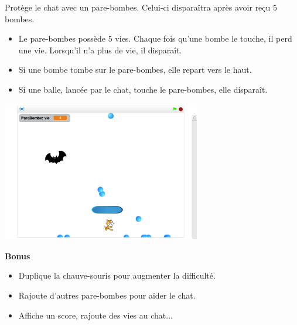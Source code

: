 \documentclass[class=report,crop=false, 12pt]{standalone}
\begin{document}
\begin{activite}

Protège le chat avec un pare-bombes. Celui-ci disparaîtra après avoir reçu $5$ bombes.
\begin{itemize}
  \item Le pare-bombes possède $5$ vies. Chaque fois qu'une bombe le touche, il perd une vie. Lorsqu'il n'a plus de vie, il disparaît.
  
  \item Si une bombe tombe sur le pare-bombes, elle repart vers le haut.

  \item Si une balle, lancée par le chat, touche le pare-bombes, elle disparaît.
\end{itemize}


\begin{center}
  \includegraphics[width=0.65\textwidth]{ecran-10-ex3} 
\end{center}


\textbf{Bonus}

\begin{itemize}
  \item Duplique la chauve-souris pour augmenter la difficulté.
  
  \item Rajoute d'autres pare-bombes pour aider le chat.
  
  \item Affiche un score, rajoute des vies au chat...

\end{itemize}
  
\end{activite}
\end{document}
